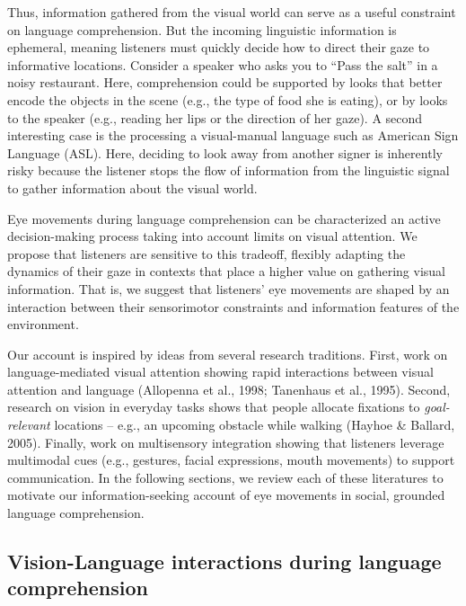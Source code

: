 \documentclass[english,floatsintext,man]{apa6}
\theoremstyle{definition}
\theoremstyle{definition}
\theoremstyle{definition}
\theoremstyle{remark}
\begin{document}
Thus, information gathered from the visual world can serve as a useful
constraint on language comprehension. But the incoming linguistic
information is ephemeral, meaning listeners must quickly decide how to
direct their gaze to informative locations. Consider a speaker who asks
you to \enquote{Pass the salt} in a noisy restaurant. Here,
comprehension could be supported by looks that better encode the objects
in the scene (e.g., the type of food she is eating), or by looks to the
speaker (e.g., reading her lips or the direction of her gaze). A second
interesting case is the processing a visual-manual language such as
American Sign Language (ASL). Here, deciding to look away from another
signer is inherently risky because the listener stops the flow of
information from the linguistic signal to gather information about the
visual world.

Eye movements during language comprehension can be characterized an
active decision-making process taking into account limits on visual
attention. We propose that listeners are sensitive to this tradeoff,
flexibly adapting the dynamics of their gaze in contexts that place a
higher value on gathering visual information. That is, we suggest that
listeners' eye movements are shaped by an interaction between their
sensorimotor constraints and information features of the environment.

Our account is inspired by ideas from several research traditions.
First, work on language-mediated visual attention showing rapid
interactions between visual attention and language (Allopenna et al.,
1998; Tanenhaus et al., 1995). Second, research on vision in everyday
tasks shows that people allocate fixations to \emph{goal-relevant}
locations -- e.g., an upcoming obstacle while walking (Hayhoe \&
Ballard, 2005). Finally, work on multisensory integration showing that
listeners leverage multimodal cues (e.g., gestures, facial expressions,
mouth movements) to support communication. In the following sections, we
review each of these literatures to motivate our information-seeking
account of eye movements in social, grounded language comprehension.

\hypertarget{vision-language-interactions-during-language-comprehension}{%
\subsection{Vision-Language interactions during language
comprehension}\label{vision-language-interactions-during-language-comprehension}}
\end{document}
